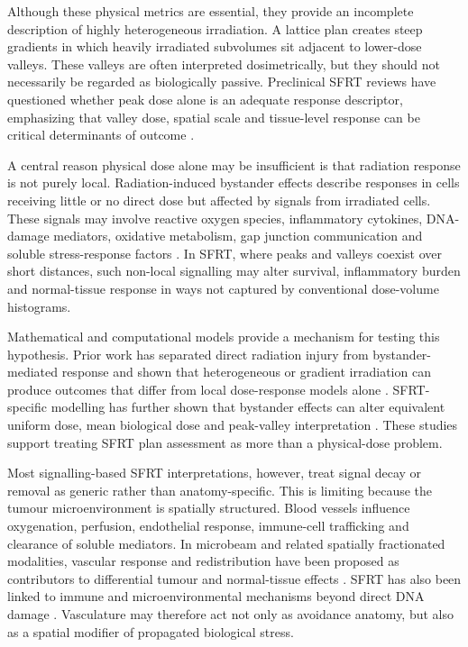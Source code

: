 \documentclass[10pt,a4paper]{article}
\begin{document}
Although these physical metrics are essential, they provide an incomplete description of highly heterogeneous irradiation. A lattice plan creates steep gradients in which heavily irradiated subvolumes sit adjacent to lower-dose valleys. These valleys are often interpreted dosimetrically, but they should not necessarily be regarded as biologically passive. Preclinical SFRT reviews have questioned whether peak dose alone is an adequate response descriptor, emphasizing that valley dose, spatial scale and tissue-level response can be critical determinants of outcome \cite{fernandez2022peak,prezado2024critical}.

A central reason physical dose alone may be insufficient is that radiation response is not purely local. Radiation-induced bystander effects describe responses in cells receiving little or no direct dose but affected by signals from irradiated cells. These signals may involve reactive oxygen species, inflammatory cytokines, DNA-damage mediators, oxidative metabolism, gap junction communication and soluble stress-response factors \cite{prise2009bystander,seymour2004bystander,azzam2003oxidative,mothersill2003models,blyth2011bystander}. In SFRT, where peaks and valleys coexist over short distances, such non-local signalling may alter survival, inflammatory burden and normal-tissue response in ways not captured by conventional dose-volume histograms.

Mathematical and computational models provide a mechanism for testing this hypothesis. Prior work has separated direct radiation injury from bystander-mediated response and shown that heterogeneous or gradient irradiation can produce outcomes that differ from local dose-response models alone \cite{ebert2010framework,mcmahon2013kinetic,peng2018models,powathil2016bystander}. SFRT-specific modelling has further shown that bystander effects can alter equivalent uniform dose, mean biological dose and peak-valley interpretation \cite{cahoon2021spatial,mahmoudi2022potential}. These studies support treating SFRT plan assessment as more than a physical-dose problem.

Most signalling-based SFRT interpretations, however, treat signal decay or removal as generic rather than anatomy-specific. This is limiting because the tumour microenvironment is spatially structured. Blood vessels influence oxygenation, perfusion, endothelial response, immune-cell trafficking and clearance of soluble mediators. In microbeam and related spatially fractionated modalities, vascular response and redistribution have been proposed as contributors to differential tumour and normal-tissue effects \cite{bouchet2015vascular,ortiz2024tumor}. SFRT has also been linked to immune and microenvironmental mechanisms beyond direct DNA damage \cite{lu2024combining}. Vasculature may therefore act not only as avoidance anatomy, but also as a spatial modifier of propagated biological stress.
\end{document}
